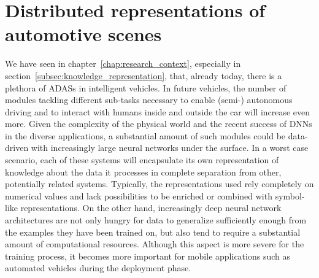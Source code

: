 \chapter{Distributed representations of automotive scenes}%
\label{chap:a_cognitive_approach_to_represent_automotive_scenes}

We have seen in chapter~\ref{chap:research_context}, especially in section~\ref{subsec:knowledge_representation}, that, already today, there is a plethora of \acfp{ADAS} in intelligent vehicles. 
In future vehicles, the number of modules tackling different sub-tasks necessary to enable (semi-) autonomous driving and to interact with humans inside and outside the car will increase even more.
Given the complexity of the physical world and the recent success of \acp{DNN} in the diverse applications, a substantial amount of such modules could be data-driven with increasingly large neural networks under the surface.
In a worst case scenario, each of these systems will encapsulate its own representation of knowledge about the data it processes in complete separation from other, potentially related systems.
Typically, the representations used rely completely on numerical values and lack possibilities to be enriched or combined with symbol-like representations.
On the other hand, increasingly deep neural network architectures are not only hungry for data to generalize sufficiently enough from the examples they have been trained on, but also tend to require a substantial amount of computational resources.
Although this aspect is more severe for the training process, it becomes more important for mobile applications such as automated vehicles during the deployment phase.

